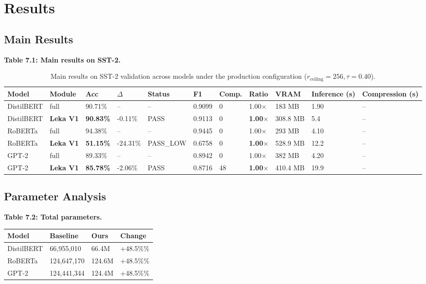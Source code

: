 \section{Results}

\subsection{Main Results}

\textbf{Table 7.1: Main results on SST-2.}

\begin{table}[t]
\centering
\small
\begin{tabular}{lllllllllll}
\toprule
\textbf{Model} & \textbf{Module} & \textbf{Acc} & \textbf{$\Delta$} & \textbf{Status} & \textbf{F1} & \textbf{Comp.} & \textbf{Ratio} & \textbf{VRAM} & \textbf{Inference (s)} & \textbf{Compression (s)} \\
\midrule
DistilBERT & full & 90.71\% & -- & -- & 0.9099 & 0 & 1.00$\times$ & 183 MB & 1.90 & -- \\
DistilBERT & \textbf{Leka V1} & \textbf{90.83\%} & -0.11\% & PASS & 0.9113 & 0 & \textbf{1.00$\times$} & 308.8 MB & 5.4 & -- \\
RoBERTa & full & 94.38\% & -- & -- & 0.9445 & 0 & 1.00$\times$ & 293 MB & 4.10 & -- \\
RoBERTa & \textbf{Leka V1} & \textbf{51.15\%} & -24.31\% & PASS\_LOW & 0.6758 & 0 & \textbf{1.00$\times$} & 528.9 MB & 12.2 & -- \\
GPT-2 & full & 89.33\% & -- & -- & 0.8942 & 0 & 1.00$\times$ & 382 MB & 4.20 & -- \\
GPT-2 & \textbf{Leka V1} & \textbf{85.78\%} & -2.06\% & PASS & 0.8716 & 48 & \textbf{1.00$\times$} & 410.4 MB & 19.9 & -- \\
\bottomrule
\end{tabular}
\caption{Main results on SST-2 validation across models under the production configuration ($r_{\mathrm{ceiling}}=256, \tau=0.40$).}
\label{tab:main_sst2}
\end{table}

\subsection{Parameter Analysis}

\textbf{Table 7.2: Total parameters.}

\begin{table}[H]
\centering
\small
\begin{tabular}{llll}
\toprule
\textbf{Model} & \textbf{Baseline} & \textbf{Ours} & \textbf{Change} \\
\midrule
DistilBERT & 66,955,010 & 66.4M & +48.5\%\% \\
RoBERTa & 124,647,170 & 124.6M & +48.5\%\% \\
GPT-2 & 124,441,344 & 124.4M & +48.5\%\% \\
\bottomrule
\end{tabular}
\end{table}

